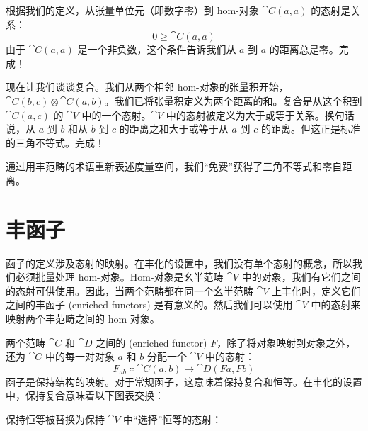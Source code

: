 根据我们的定义，从张量单位元（即数字零）到 hom-对象 $\cat{C}(a, a)$ 的态射是关系：
\[0 \geqslant \cat{C}(a, a)\]
由于 $\cat{C}(a, a)$ 是一个非负数，这个条件告诉我们从 $a$ 到 $a$ 的距离总是零。完成！

现在让我们谈谈复合。我们从两个相邻 hom-对象的张量积开始，$\cat{C}(b, c) \otimes \cat{C}(a, b)$。我们已将张量积定义为两个距离的和。复合是从这个积到 $\cat{C}(a, c)$ 的 $\cat{V}$ 中的一个态射。$\cat{V}$ 中的态射被定义为大于或等于关系。换句话说，从 $a$ 到 $b$ 和从 $b$ 到 $c$ 的距离之和大于或等于从 $a$ 到 $c$ 的距离。但这正是标准的三角不等式。完成！

通过用丰范畴的术语重新表述度量空间，我们“免费”获得了三角不等式和零自距离。

\section{丰函子}

函子的定义涉及态射的映射。在丰化的设置中，我们没有单个态射的概念，所以我们必须批量处理 hom-对象。Hom-对象是幺半范畴 $\cat{V}$ 中的对象，我们有它们之间的态射可供使用。因此，当两个范畴都在同一个幺半范畴 $\cat{V}$ 上丰化时，定义它们之间的丰函子 (enriched functors) 是有意义的。然后我们可以使用 $\cat{V}$ 中的态射来映射两个丰范畴之间的 hom-对象。

两个范畴 $\cat{C}$ 和 $\cat{D}$ 之间的  (enriched functor) $F$，除了将对象映射到对象之外，还为 $\cat{C}$ 中的每一对对象 $a$ 和 $b$ 分配一个 $\cat{V}$ 中的态射：
\[F_{a b} \Colon \cat{C}(a, b) \to \cat{D}(F a, F b)\]
函子是保持结构的映射。对于常规函子，这意味着保持复合和恒等。在丰化的设置中，保持复合意味着以下图表交换：

\begin{figure}[H]
  \centering
\end{figure}

\noindent
保持恒等被替换为保持 $\cat{V}$ 中“选择”恒等的态射：

\begin{figure}[H]
  \centering
\end{figure}

